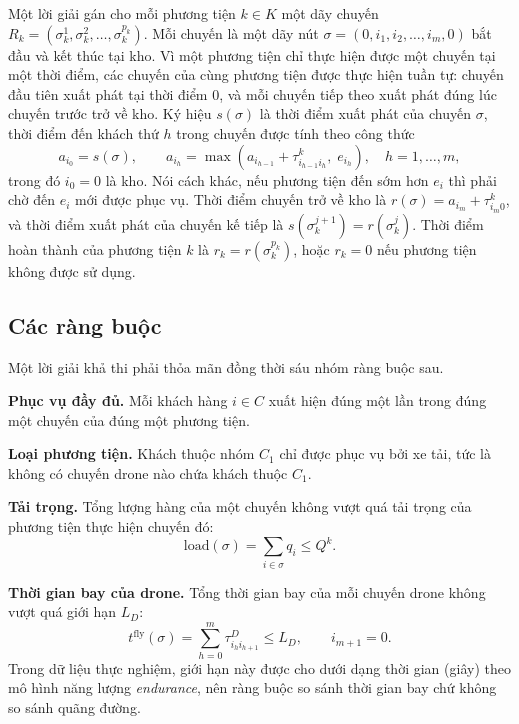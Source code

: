 \documentclass[../DoAn.tex]{subfiles}
\begin{document}
Một lời giải gán cho mỗi phương tiện $k \in K$ một dãy chuyến $R_k = (\sigma^1_k, \sigma^2_k, \ldots, \sigma^{p_k}_k)$. Mỗi chuyến là một dãy nút $\sigma = (0, i_1, i_2, \ldots, i_m, 0)$ bắt đầu và kết thúc tại kho. Vì một phương tiện chỉ thực hiện được một chuyến tại một thời điểm, các chuyến của cùng phương tiện được thực hiện tuần tự: chuyến đầu tiên xuất phát tại thời điểm $0$, và mỗi chuyến tiếp theo xuất phát đúng lúc chuyến trước trở về kho. Ký hiệu $s(\sigma)$ là thời điểm xuất phát của chuyến $\sigma$, thời điểm đến khách thứ $h$ trong chuyến được tính theo công thức
\begin{equation}
a_{i_0} = s(\sigma), \qquad
a_{i_h} = \max\!\left(a_{i_{h-1}} + \tau^{k}_{i_{h-1} i_h},\; e_{i_h}\right), \quad h = 1, \ldots, m,
\label{eq:arrival}
\end{equation}
trong đó $i_0 = 0$ là kho. Nói cách khác, nếu phương tiện đến sớm hơn $e_i$ thì phải chờ đến $e_i$ mới được phục vụ. Thời điểm chuyến trở về kho là $r(\sigma) = a_{i_m} + \tau^{k}_{i_m 0}$, và thời điểm xuất phát của chuyến kế tiếp là $s(\sigma^{j+1}_k) = r(\sigma^j_k)$. Thời điểm hoàn thành của phương tiện $k$ là $r_k = r(\sigma^{p_k}_k)$, hoặc $r_k = 0$ nếu phương tiện không được sử dụng.

\subsection{Các ràng buộc}

Một lời giải khả thi phải thỏa mãn đồng thời sáu nhóm ràng buộc sau.

\textbf{Phục vụ đầy đủ.} Mỗi khách hàng $i \in C$ xuất hiện đúng một lần trong đúng một chuyến của đúng một phương tiện.

\textbf{Loại phương tiện.} Khách thuộc nhóm $C_1$ chỉ được phục vụ bởi xe tải, tức là không có chuyến drone nào chứa khách thuộc $C_1$.

\textbf{Tải trọng.} Tổng lượng hàng của một chuyến không vượt quá tải trọng của phương tiện thực hiện chuyến đó:
\begin{equation}
\mathrm{load}(\sigma) = \sum_{i \in \sigma} q_i \leq Q^{k}.
\label{eq:capacity}
\end{equation}

\textbf{Thời gian bay của drone.} Tổng thời gian bay của mỗi chuyến drone không vượt quá giới hạn $L_D$:
\begin{equation}
t^{\mathrm{fly}}(\sigma) = \sum_{h=0}^{m} \tau^{D}_{i_h i_{h+1}} \leq L_D, \qquad i_{m+1} = 0.
\label{eq:endurance}
\end{equation}
Trong dữ liệu thực nghiệm, giới hạn này được cho dưới dạng thời gian (giây) theo mô hình năng lượng \textit{endurance}, nên ràng buộc so sánh thời gian bay chứ không so sánh quãng đường.
\end{document}
